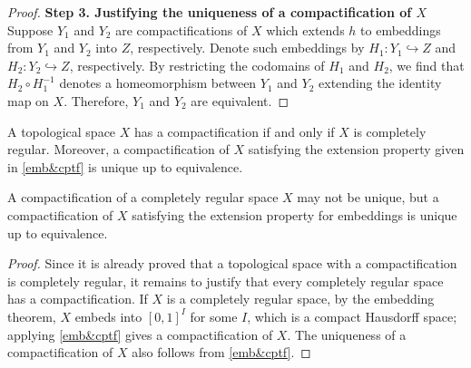 \begin{proof}
    \indent\textbf{Step 3. Justifying the uniqueness of a compactification of $X$}\newline
    Suppose $Y_1$ and $Y_2$ are compactifications of $X$ which extends $h$ to embeddings from $Y_1$ and $Y_2$ into $Z$, respectively.
    Denote such embeddings by $H_1: Y_1\hookrightarrow Z$ and $H_2: Y_2\hookrightarrow Z$, respectively.
    By restricting the codomains of $H_1$ and $H_2$, we find that $H_2\circ H_1^{-1}$ denotes a homeomorphism between $Y_1$ and $Y_2$ extending the identity map on $X$.
    Therefore, $Y_1$ and $Y_2$ are equivalent.
\end{proof}
\begin{cor}
    A topological space $X$ has a compactification if and only if $X$ is completely regular.
    Moreover, a compactification of $X$ satisfying the extension property given in \cref{emb&cptf} is unique up to equivalence.
\end{cor}
\begin{rmk}
    A compactification of a completely regular space $X$ may not be unique, but a compactification of $X$ satisfying the extension property for embeddings is unique up to equivalence.
\end{rmk}
\begin{proof}
    Since it is already proved that a topological space with a compactification is completely regular, it remains to justify that every completely regular space has a compactification.
    If $X$ is a completely regular space, by the embedding theorem, $X$ embeds into $[0, 1]^I$ for some $I$, which is a compact Hausdorff space; applying \cref{emb&cptf} gives a compactification of $X$.
    The uniqueness of a compactification of $X$ also follows from \cref{emb&cptf}.
\end{proof}
